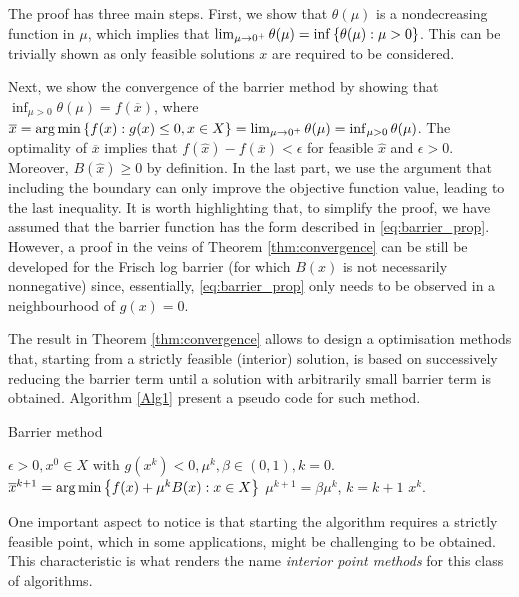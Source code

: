 The proof has three main steps. First, we show that $\theta(\mu)$ is a nondecreasing function in $\mu$, which implies that $\lim_{\mu \rightarrow 0^+}\theta(\mu)= \inf\left\{ \theta(\mu) : \mu > 0 \right \}$. This can be trivially shown as only feasible solutions $x$ are required to be considered. 

Next, we show the convergence of the barrier method by showing that $\inf_{\mu > 0}\theta(\mu) = f(\overline{x})$, where $\overline{x} = \arg\min\left\{ f(x) : g(x) \leq 0, x \in X \right \} = \lim_{\mu \rightarrow 0^+} \theta(\mu) = \inf_{\mu > 0} \theta(\mu)$. The optimality of $\overline{x}$ implies that $ f(\hat{x}) - f(\overline{x}) < \epsilon$ for feasible $\hat{x}$ and $\epsilon > 0$. Moreover, $B(\hat{x}) \geq 0$ by definition. In the last part, we use the argument that including the boundary can only improve the objective function value, leading to the last inequality. It is worth highlighting that, to simplify the proof, we have assumed that the barrier function has the form described in \eqref{eq:barrier_prop}. However, a proof in the veins of Theorem \ref{thm:convergence} can be still be developed for the Frisch log barrier (for which $B(x)$ is not necessarily nonnegative) since, essentially, \eqref{eq:barrier_prop} only needs to be observed in a neighbourhood of $g(x) = 0$.

The result in Theorem \ref{thm:convergence} allows to design a optimisation methods that, starting from a strictly feasible (interior) solution, is based on successively reducing the barrier term until a solution with arbitrarily small barrier term is obtained. Algorithm \ref{Alg1} present a pseudo code for such method.

\begin{algorithm}[H]
\caption{Barrier method} \label{Alg1}
\begin{algorithmic}[1] %
 $\epsilon > 0, x^0 \in X \text{ with } g(x^k) < 0, \mu^k, \beta \in (0,1), k = 0$. 
    \State $\overline{x}^{k+1} = \arg\min \left\{ f(x) + \mu^kB(x) : x \in X \right \}$ \label{x-step}
    \State $\mu^{k+1} = \beta\mu^k$, $k = k+1$ 
\EndWhile
{} $x^k$.
\end{algorithmic}
\end{algorithm}

One important aspect to notice is that starting the algorithm requires a strictly feasible point, which in some applications, might be challenging to be obtained. This characteristic is what renders the name \emph{interior point methods} for this class of algorithms. 

